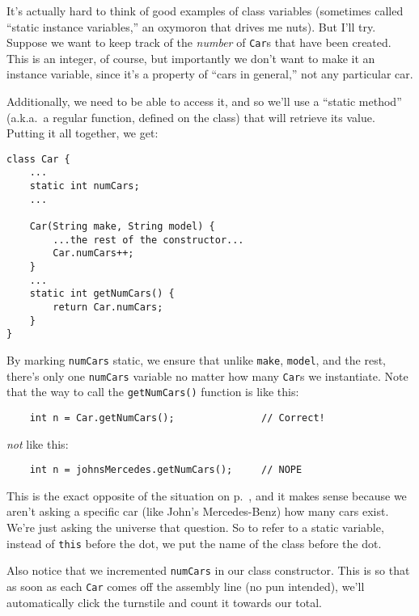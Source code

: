 \smallskip

It's actually hard to think of good examples of class variables (sometimes
called ``static instance variables,'' an oxymoron that drives me nuts). But
I'll try. Suppose we want to keep track of the \textit{number} of \texttt{Car}s
that have been created. This is an integer, of course, but importantly we don't
want to make it an instance variable, since it's a property of ``cars in
general,'' not any particular car.

Additionally, we need to be able to access it, and so we'll use a ``static
method'' (a.k.a.~a regular function, defined on the class) that will retrieve
its value. Putting it all together, we get:

\vspace{.15in}
\begin{Verbatim}[fontsize=\footnotesize,samepage=true,frame=single,framesep=3mm]
class Car {
    ...
    static int numCars;
    ...

    Car(String make, String model) {
        ...the rest of the constructor...
        Car.numCars++;
    }
    ...
    static int getNumCars() {
        return Car.numCars;
    }
}
\end{Verbatim}

By marking \texttt{numCars} static, we ensure that unlike \texttt{make},
\texttt{model}, and the rest, there's only one \texttt{numCars} variable no
matter how many \texttt{Car}s we instantiate. Note that the way to call the
\texttt{getNumCars()} function is like this:

\begin{verbatim}
    int n = Car.getNumCars();               // Correct!
\end{verbatim}

\textit{not} like this:

\begin{verbatim}
    int n = johnsMercedes.getNumCars();     // NOPE
\end{verbatim}

This is the exact opposite of the situation on p.~\pageref{callMethodOnObject},
and it makes sense because we aren't asking a specific car (like John's
Mercedes-Benz) how many cars exist. We're just asking the universe that
question. So to refer to a static variable, instead of \texttt{this} before the
dot, we put the name of the class before the dot.

\smallskip
Also notice that we incremented \texttt{numCars} in our class constructor. This
is so that as soon as each \texttt{Car} comes off the assembly line (no pun
intended), we'll automatically click the turnstile and count it towards our
total.

